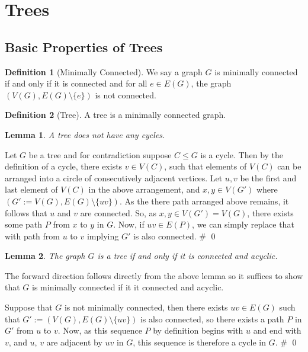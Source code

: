 \documentclass[
]{article}
\newtheorem{lemma}{Lemma}
\theoremstyle{definition}
\newtheorem{definition}{Definition}[section]
\begin{document}
\hypertarget{trees}{%
\section{Trees}\label{trees}}

\hypertarget{basic-properties-of-trees}{%
\subsection{Basic Properties of Trees}\label{basic-properties-of-trees}}

\begin{definition}[Minimally Connected]
  We say a graph \(G\) is minimally connected if and only if it is connected 
  and for all \(e \in E(G)\), the graph \((V(G), E(G) \setminus \{e\})\) is not 
  connected.
\end{definition}

\begin{definition}[Tree]
  A tree is a minimally connected graph.
\end{definition}

\begin{lemma}
  A tree does not have any cycles.
\end{lemma}
\proof

Let \(G\) be a tree and for contradiction suppose \(C \le G\) is a
cycle. Then by the definition of a cycle, there exists \(v \in V(C)\),
such that elements of \(V(C)\) can be arranged into a circle of
consecutively adjacent vertices. Let \(u, v\) be the first and last
element of \(V(C)\) in the above arrangement, and \(x, y \in V(G')\)
where \((G' := V(G), E(G) \setminus \{uv\})\). As the there path
arranged above remains, it follows that \(u\) and \(v\) are connected.
So, as \(x, y \in V(G') = V(G)\), there exists some path \(P\) from
\(x\) to \(y\) in \(G\). Now, if \(uv \in E(P)\), we can simply replace
that with path from \(u\) to \(v\) implying \(G'\) is also connected. \#
\qed

\begin{lemma}\label{tree_acyclic}
  The graph \(G\) is a tree if and only if it is connected and acyclic.
\end{lemma}
\proof

The forward direction follows directly from the above lemma so it
suffices to show that \(G\) is minimally connected if it it connected
and acyclic.

Suppose that \(G\) is not minimally connected, then there exists
\(uv \in E(G)\) such that \(G' := (V(G), E(G) \setminus \{uv\})\) is
also connected, so there exists a path \(P\) in \(G'\) from \(u\) to
\(v\). Now, as this sequence \(P\) by definition begins with \(u\) and
end with \(v\), and \(u\), \(v\) are adjacent by \(uv\) in \(G\), this
sequence is therefore a cycle in \(G\). \# \qed
\end{document}
